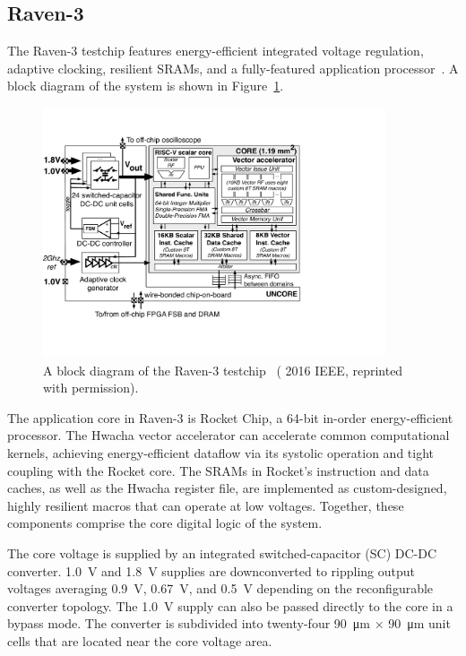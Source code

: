 \documentclass[graybox]{svmult}
\begin{document}
\subsection{Raven-3}

The Raven-3 testchip features energy-efficient integrated voltage regulation, adaptive clocking, resilient SRAMs, and a fully-featured application processor~\cite{Zimmer2016}.
A block diagram of the system is shown in Figure~\ref{fig:6-raven3-blockdiagram}.

\begin{figure}
  \centering
  \includegraphics[width=0.9\textwidth]{6-raven3-blockdiagram}
  \caption{A block diagram of the Raven-3 testchip~\cite{Zimmer2016} ({\textcopyright} 2016 IEEE, reprinted with permission).}
  \label{fig:6-raven3-blockdiagram}
\end{figure}

The application core in Raven-3 is Rocket Chip, a 64-bit in-order energy-efficient processor.
The Hwacha vector accelerator can accelerate common computational kernels, achieving energy-efficient dataflow via its systolic operation and tight coupling with the Rocket core.
The SRAMs in Rocket's instruction and data caches, as well as the Hwacha register file, are implemented as custom-designed, highly resilient macros that can operate at low voltages.
Together, these components comprise the core digital logic of the system.

The core voltage is supplied by an integrated switched-capacitor (SC) DC-DC converter.
\SI{1.0}{\volt} and \SI{1.8}{\volt} supplies are downconverted to rippling output voltages averaging \SI{0.9}{\volt}, \SI{0.67}{\volt}, and \SI{0.5}{\volt} depending on the reconfigurable converter topology.
The \SI{1.0}{\volt} supply can also be passed directly to the core in a bypass mode.
The converter is subdivided into twenty-four \SI{90}{\micro\meter} $\times$ \SI{90}{\micro\meter} unit cells that are located near the core voltage area.
\end{document}
